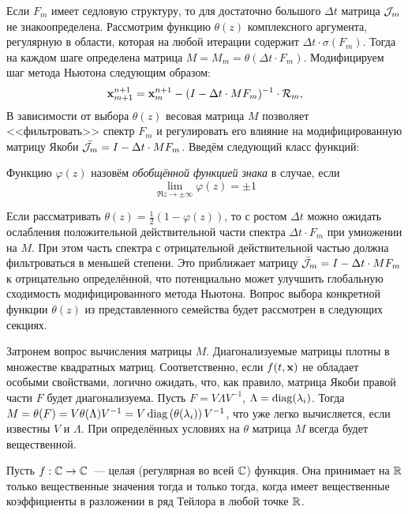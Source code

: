 Если $ F_m $ имеет седловую структуру, то для достаточно большого $ \Delta t $ матрица $ \mathcal{J}_m $ не знакоопределена.
Рассмотрим функцию $ \theta(z) $ комплексного аргумента, регулярную в области, которая на любой итерации содержит $ \Delta t \cdot \sigma(F_m) $.
Тогда на каждом шаге определена матрица $ M = M_m = \theta(\Delta t \cdot F_m) $.
Модифицируем шаг метода Ньютона следующим образом:
%
\begin{equation}
    \label{eq:modified_Newton_iteration}
    \mathbf{x}_{m+1}^{n+1} = \mathbf{x}_m^{n+1} - (I - \Delta t \cdot M F_m)^{-1} \cdot \mathcal{R}_m,
\end{equation}
%
В зависимости от выбора $ \theta(z) $ весовая матрица $ M $ позволяет <<фильтровать>> спектр $ F_m $
и регулировать его влияние на модифицированную матрицу Якоби $ \bar{\mathcal{J}_m} = I - \Delta t \cdot M F_m $.
Введём следующий класс функций:

\begin{definition}
    \label{def:generalized_sign_function}
    Функцию $ \varphi(z) $ назовём \emph{обобщённой функцией знака} в случае, если
    \[
        \lim_{\Re z \to \pm \infty} \varphi(z) = \pm 1
    \]
\end{definition}

Если рассматривать $ \theta(z) = \frac{1}{2} (1 - \varphi(z)) $,
то с ростом $ \Delta t $ можно ожидать ослабления положительной действительной части спектра $ \Delta t \cdot F_m $ при умножении на $ M $.
При этом часть спектра с отрицательной действительной частью должна фильтроваться в меньшей степени.
Это приближает матрицу $ \bar{\mathcal{J}}_m = I - \Delta t \cdot M F_m $ к отрицательно определённой,
что потенциально может улучшить глобальную сходимость модифицированного метода Ньютона.
Вопрос выбора конкретной функции $ \theta(z) $ из представленного семейства будет рассмотрен в следующих секциях.

Затронем вопрос вычисления матрицы $ M $.
Диагонализуемые матрицы плотны в множестве квадратных матриц.
Соответственно, если $ f(t, \mathbf{x}) $ не обладает особыми свойствами, логично ожидать, что, как правило,
матрица Якоби правой части $ F $ будет диагонализуема.
Пусть $ F = V \Lambda V^{-1} $, $ \Lambda = \operatorname{diag}(\lambda_i) $.
Тогда $ M = \theta(F) = V \theta(\Lambda) V^{-1} = V \operatorname{diag}\left( \theta(\lambda_i) \right) V^{-1} $,
что уже легко вычисляется, если известны $ V $ и $ \Lambda $.
При определённых условиях на $ \theta $ матрица $ M $ всегда будет вещественной.

\begin{statement}
    \label{stat:whole_real_function}
    Пусть $ f: \mathbb{C} \to \mathbb{C} $~--- целая (регулярная во всей $ \mathbb{C} $) функция.
    Она принимает на $ \mathbb{R} $ только вещественные значения тогда и только тогда,
    когда имеет вещественные коэффициенты в разложении в ряд Тейлора в любой точке $ \mathbb{R} $.
\end{statement}


